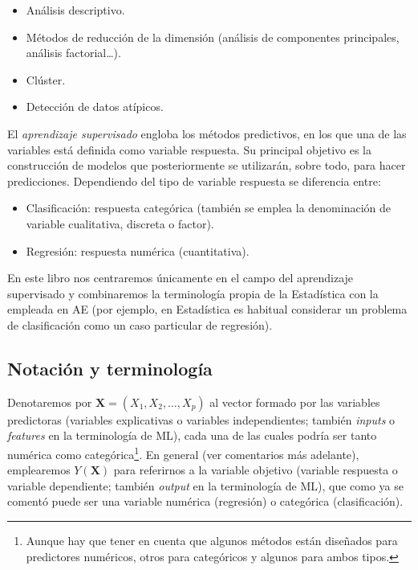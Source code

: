 \documentclass[
]{book}
\theoremstyle{break}
\theoremstyle{definition}
\theoremstyle{definition}
\theoremstyle{definition}
\theoremstyle{remark}
\begin{document}
\begin{itemize}
\item
  Análisis descriptivo.
\item
  Métodos de reducción de la dimensión (análisis de componentes principales, análisis factorial\ldots).
\item
  Clúster.
\item
  Detección de datos atípicos.
\end{itemize}

El \emph{aprendizaje supervisado} engloba los métodos predictivos, en los que una de las variables está definida como variable respuesta. Su principal objetivo es la construcción de modelos que posteriormente se utilizarán, sobre todo, para hacer predicciones. Dependiendo del tipo de variable respuesta se diferencia entre:

\begin{itemize}
\item
  Clasificación: respuesta categórica (también se emplea la denominación de variable cualitativa, discreta o factor).
\item
  Regresión: respuesta numérica (cuantitativa).
\end{itemize}

En este libro nos centraremos únicamente en el campo del aprendizaje supervisado y combinaremos la terminología propia de la Estadística con la empleada en AE (por ejemplo, en Estadística es habitual considerar un problema de clasificación como un caso particular de regresión).

\hypertarget{notacion}{%
\subsection{Notación y terminología}\label{notacion}}

Denotaremos por \(\mathbf{X}=(X_1, X_2, \ldots, X_p)\) al vector formado por las variables predictoras
(variables explicativas o variables independientes; también \emph{inputs} o \emph{features} en la terminología de ML), cada una de las cuales podría ser tanto numérica como categórica\footnote{Aunque hay que tener en cuenta que algunos métodos están diseñados para predictores numéricos, otros para categóricos y algunos para ambos tipos.}.
En general (ver comentarios más adelante), emplearemos \(Y\left(\mathbf{X} \right)\) para referirnos a la variable objetivo (variable respuesta o variable dependiente; también \emph{output} en la terminología de ML), que como ya se comentó puede ser una variable numérica (regresión) o categórica (clasificación).
\end{document}
